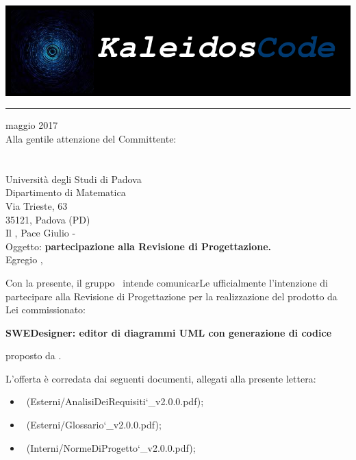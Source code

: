 \documentclass[a4paper,12pt]{article}
\author{KaleidosCode}
\date{01/04/2017}	%
\begin{document}
	\begin{titlepage}
		\includegraphics[scale=0.2]{../../../Immagini/KaleidosCodeLogo.png}
		\hrule
		\vspace{1.2cm}
		 maggio 2017\\
		\vspace{0.4cm}
		Alla gentile attenzione del Committente:\\
		\vardanega\\
		\cardin\\
		Università degli Studi di Padova\\
		Dipartimento di Matematica\\
		Via Trieste, 63\\
		35121, Padova (PD)\\
		\vspace{1.2cm}
		\flushleft Il \responsabilediprogetto, Pace Giulio - \kaleidoscode\\
		\vspace{0.4cm}
		Oggetto: \textbf{partecipazione alla Revisione di Progettazione.}\\
		\vspace{1cm}
		Egregio \vardanega,\\
		\vspace{0.4cm}
		\par Con la presente, il gruppo \kaleidoscode\ intende comunicarLe ufficialmente l'intenzione di partecipare alla Revisione
		di Progettazione per la realizzazione del prodotto da Lei commissionato:
		\begin{center}
			\textbf{SWEDesigner: editor di diagrammi UML con generazione di codice} 
		\end{center}
		proposto da \proponente.
		\par L'offerta è corredata dai seguenti documenti, allegati alla presente lettera:
		\begin{itemize}
			\item \analisideirequisitiRP\ (Esterni/AnalisiDeiRequisiti\char`_v2.0.0.pdf);
			\item \glossarioRP\ (Esterni/Glossario\char`_v2.0.0.pdf);
			\item \normediprogettoRP\ (Interni/NormeDiProgetto\char`_v2.0.0.pdf);

\end{itemize}
\end{titlepage}
\end{document}
